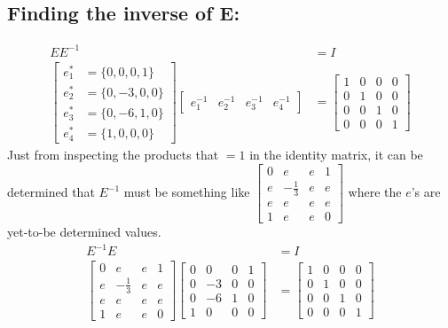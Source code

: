\documentclass[fleqn]{article}
\begin{document}
\subsection*{Finding the inverse of E:}
\begin{equation*}
    \begin{split}
        EE^{-1} &= I\\
        \begin{bmatrix}e^{*}_1 &= \{0,0,0,1\}\\e^{*}_2 &= \{0,-3,0,0\}\\e^{*}_3 &= \{0, -6, 1, 0\}\\e^{*}_4 &= \{1,0,0,0\}\end{bmatrix} \begin{bmatrix}e^{-1}_1 & e^{-1}_2 & e^{-1}_3 & e^{-1}_4 \end{bmatrix} &= \begin{bmatrix}1&0&0&0\\0&1&0&0\\0&0&1&0\\0&0&0&1\end{bmatrix}
    \end{split}
\end{equation*}
Just from inspecting the products that $= 1$ in the identity matrix, it can be determined that $E^{-1}$ must be something like
$\begin{bmatrix}0&e&e&1\\e&-\frac{1}{3}&e&e\\e&e&e&e\\1&e&e&0\end{bmatrix}$ where the $e$'s are yet-to-be determined values.
\begin{equation*}
    \begin{split}
        E^{-1}E &= I\\
        \begin{bmatrix}0&e&e&1\\e&-\frac{1}{3}&e&e\\e&e&e&e\\1&e&e&0\end{bmatrix} \begin{bmatrix}0&0&0&1\\0&-3&0&0\\0&-6&1&0\\1&0&0&0\end{bmatrix} &= \begin{bmatrix}1&0&0&0\\0&1&0&0\\0&0&1&0\\0&0&0&1\end{bmatrix}
    \end{split}
\end{equation*}
\end{document}

